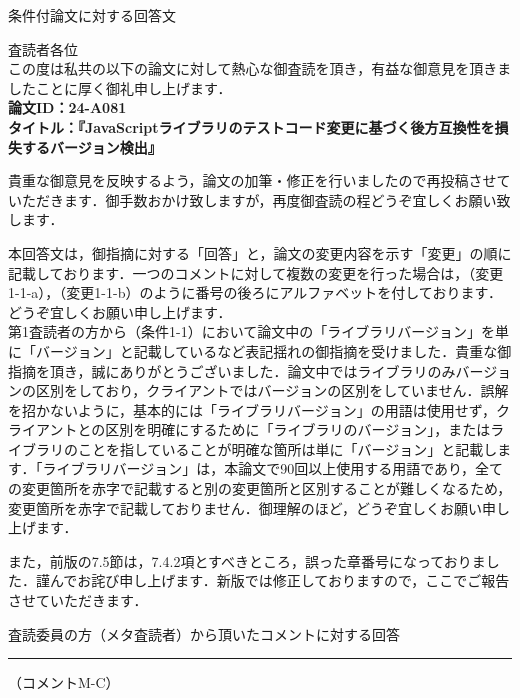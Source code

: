 \documentclass{jarticle} %
\def\restitle{条件付論文に対する回答文}
\def\section#1{ \vspace{3pc} {\large \gt #1} \vspace{1pc} \hrule }
\def\subsection#1{ \vspace{1pc} {\gt #1} }
\begin{document}
{\Large \gt \restitle}

\vspace{3pc}

査読者各位\\


この度は私共の以下の論文に対して熱心な御査読を頂き，有益な御意見を頂きましたことに厚く御礼申し上げます．\\
\textbf{論文ID：24-A081}\\
\textbf{タイトル：『JavaScriptライブラリのテストコード変更に基づく後方互換性を損失するバージョン検出』}

貴重な御意見を反映するよう，論文の加筆・修正を行いましたので再投稿させていただきます．御手数おかけ致しますが，再度御査読の程どうぞ宜しくお願い致します．	

本回答文は，御指摘に対する「回答」と，論文の変更内容を示す「変更」の順に記載しております．一つのコメントに対して複数の変更を行った場合は，（変更1-1-a），（変更1-1-b）のように番号の後ろにアルファベットを付しております．どうぞ宜しくお願い申し上げます．\\

第1査読者の方から（条件1-1）において論文中の「ライブラリバージョン」を単に「バージョン」と記載しているなど表記揺れの御指摘を受けました．貴重な御指摘を頂き，誠にありがとうございました．論文中ではライブラリのみバージョンの区別をしており，クライアントではバージョンの区別をしていません．誤解を招かないように，基本的には「ライブラリバージョン」の用語は使用せず，クライアントとの区別を明確にするために「ライブラリのバージョン」，またはライブラリのことを指していることが明確な箇所は単に「バージョン」と記載します．「ライブラリバージョン」は，本論文で90回以上使用する用語であり，全ての変更箇所を赤字で記載すると別の変更箇所と区別することが難しくなるため，変更箇所を赤字で記載しておりません．御理解のほど，どうぞ宜しくお願い申し上げます．

また，前版の7.5節は，7.4.2項とすべきところ，誤った章番号になっておりました．謹んでお詫び申し上げます．新版では修正しておりますので，ここでご報告させていただきます．

\section{査読委員の方（メタ査読者）から頂いたコメントに対する回答}

\subsection{（コメントM-C）}
\end{document}
